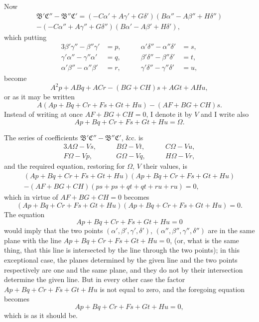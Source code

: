 \documentclass[11pt,a4paper]{book}
\begin{document}
Now
\begin{multline*}
\mathfrak{B}'\mathfrak{C}'' - \mathfrak{B}''\mathfrak{C}' = (-C\alpha' + A\gamma' + G\delta')(B\alpha'' - A\beta'' + H\delta'')\\
- (-C\alpha'' + A\gamma'' + G\delta'')(B\alpha' - A\beta' + H\delta'),
\end{multline*}
which putting
\begin{alignat*}{3}
\beta'\gamma'' - \beta''\gamma' &= p, &\qquad \alpha'\delta'' - \alpha''\delta' &= s,\\
\gamma'\alpha'' - \gamma''\alpha' &= q, &\qquad \beta'\delta'' - \beta''\delta' &= t,\\
\alpha'\beta'' - \alpha''\beta' &= r, &\qquad \gamma'\delta'' - \gamma''\delta' &= u,
\end{alignat*}
become
\[
A^2p + ABq + ACr - (BG + CH)s + AGt + AH u,
\]
or as it may be written
\[
A(Ap + Bq + Cr + Fs + Gt + Hu) - (AF + BG + CH)s.
\]
Instead of writing at once $AF + BG + CH = 0$, I denote it by $V$ and I write also
\[
Ap + Bq + Cr + Fs + Gt + Hu = \Omega.
\]

The series of coefficients $\mathfrak{B}'\mathfrak{C}'' - \mathfrak{B}''\mathfrak{C}'$, \&c. is
\begin{alignat*}{3}
A\Omega - Vs, &\qquad B\Omega - Vt, &\qquad C\Omega - Vu,\\
F\Omega - Vp, &\qquad G\Omega - Vq, &\qquad H\Omega - Vr,
\end{alignat*}
and the required equation, restoring for $\Omega$, $V$ their values, is
\begin{multline*}
(Ap + Bq + Cr + Fs + Gt + Hu)(Ap + Bq + Cr + Fs + Gt + Hu)\\
- (AF + BG + CH)(ps + ps + qt + qt + ru + ru) = 0,
\end{multline*}
which in virtue of $AF + BG + CH = 0$ becomes
\[
(Ap + Bq + Cr + Fs + Gt + Hu)(Ap + Bq + Cr + Fs + Gt + Hu) = 0.
\]
The equation
\[
Ap + Bq + Cr + Fs + Gt + Hu = 0
\]
would imply that the two points $(\alpha', \beta', \gamma', \delta')$, $(\alpha'', \beta'', \gamma'', \delta'')$ are in the same plane with the line $Ap + Bq + Cr + Fs + Gt + Hu = 0$, (or, what is the same thing, that this line is intersected by the line through the two points); in this exceptional case, the planes determined by the given line and the two points respectively are one and the same plane, and they do not by their intersection determine the given line. But in every other case the factor $Ap + Bq + Cr + Fs + Gt + Hu$ is not equal to zero, and the foregoing equation becomes
\[
Ap + Bq + Cr + Fs + Gt + Hu = 0,
\]
which is as it should be.
\end{document}
